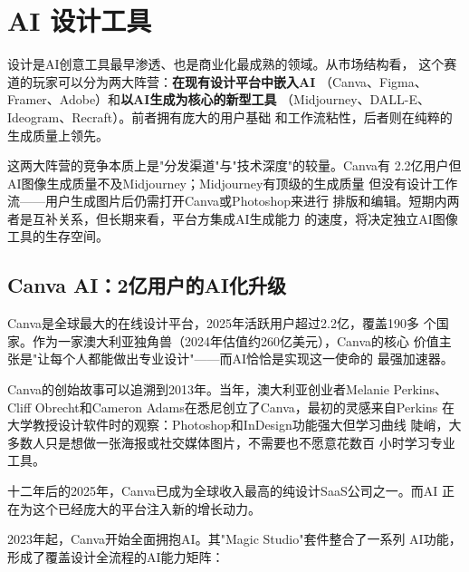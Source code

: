 
\section{AI 设计工具}
\label{sec:create-design}

设计是AI创意工具最早渗透、也是商业化最成熟的领域。从市场结构看，
这个赛道的玩家可以分为两大阵营：\textbf{在现有设计平台中嵌入AI}
（Canva、Figma、Framer、Adobe）和\textbf{以AI生成为核心的新型工具}
（Midjourney、DALL-E、Ideogram、Recraft）。前者拥有庞大的用户基础
和工作流粘性，后者则在纯粹的生成质量上领先。

这两大阵营的竞争本质上是"分发渠道"与"技术深度"的较量。Canva有
2.2亿用户但AI图像生成质量不及Midjourney；Midjourney有顶级的生成质量
但没有设计工作流——用户生成图片后仍需打开Canva或Photoshop来进行
排版和编辑。短期内两者是互补关系，但长期来看，平台方集成AI生成能力
的速度，将决定独立AI图像工具的生存空间。

\subsection{Canva AI：2亿用户的AI化升级}
\label{subsec:canva-ai}

Canva是全球最大的在线设计平台，2025年活跃用户超过2.2亿，覆盖190多
个国家。作为一家澳大利亚独角兽（2024年估值约260亿美元），Canva的核心
价值主张是"让每个人都能做出专业设计"——而AI恰恰是实现这一使命的
最强加速器。

Canva的创始故事可以追溯到2013年。当年，澳大利亚创业者Melanie Perkins、
Cliff Obrecht和Cameron Adams在悉尼创立了Canva，最初的灵感来自Perkins
在大学教授设计软件时的观察：Photoshop和InDesign功能强大但学习曲线
陡峭，大多数人只是想做一张海报或社交媒体图片，不需要也不愿意花数百
小时学习专业工具。

十二年后的2025年，Canva已成为全球收入最高的纯设计SaaS公司之一。而AI
正在为这个已经庞大的平台注入新的增长动力。

2023年起，Canva开始全面拥抱AI。其"Magic Studio"套件整合了一系列
AI功能，形成了覆盖设计全流程的AI能力矩阵：

